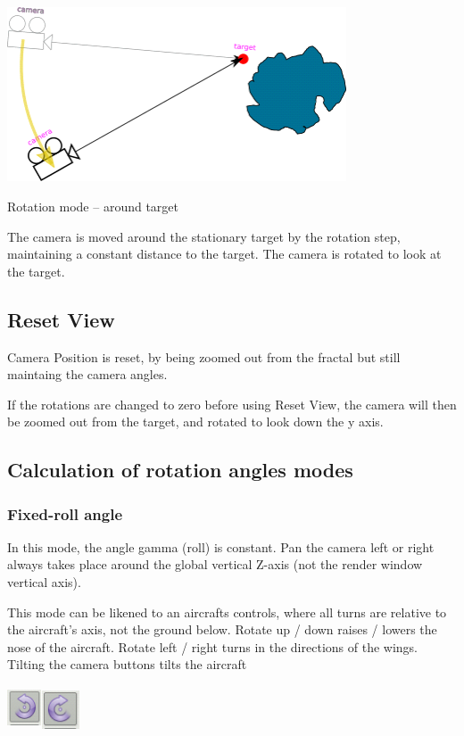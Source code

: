 \includegraphics[width=3.95347in,height=2.03472in]{img/manual/media/image15.png}

Rotation mode -- around target

The camera is moved around the stationary target by the rotation step,
maintaining a constant distance to the target. The camera is rotated to look at
the target.

\subsection{Reset View}\label{reset-view}

Camera Position is reset, by being zoomed out from the fractal but still
maintaing the camera angles.

If the rotations are changed to zero before using Reset View, the camera will
then be zoomed out from the target, and rotated to look down the y axis.

\subsection{Calculation of rotation angles
	modes}\label{calculation-of-rotation-angles-modes}

\subsubsection{Fixed-roll angle}\label{fixed-roll-angle}

In this mode, the angle gamma (roll) is constant. Pan the camera left or right
always takes place around the global vertical Z-axis (not the render window
vertical axis).

This mode can be likened to an aircrafts controls, where all turns are relative
to the aircraft's axis, not the ground below. Rotate up / down raises / lowers
the nose of the aircraft. Rotate left / right turns in the directions of the
wings. Tilting the camera buttons tilts the aircraft

\includegraphics[width=0.40000in,height=0.50000in]{img/manual/media/image16.png}\includegraphics[width=0.45347in,height=0.45347in]{img/manual/media/image17.png}

